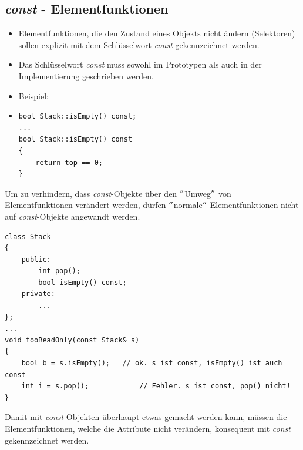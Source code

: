 \subsection{\emph{const} - Elementfunktionen}
\begin{itemize}
	\item Elementfunktionen, die den Zustand eines Objekts nicht ändern (Selektoren) sollen explizit mit dem Schlüsselwort \emph{const} gekennzeichnet werden.
	\item Das Schlüsselwort \emph{const} muss sowohl im Prototypen als auch in der Implementierung geschrieben werden.
	\item Beispiel:
	\item[\-] \vspace{-\baselineskip}
	\begin{minipage}{0.4\linewidth}
\begin{lstlisting}
bool Stack::isEmpty() const;
...
bool Stack::isEmpty() const
{
	return top == 0;
}
\end{lstlisting}
	\end{minipage}
\end{itemize}
Um zu verhindern, dass \emph{const}-Objekte über den $"$Umweg$"$ von Elementfunktionen verändert werden, dürfen $"$normale$"$ Elementfunktionen nicht auf \emph{const}-Objekte angewandt werden.
\noindent
\begin{minipage}{0.9\linewidth}
\begin{lstlisting}
class Stack
{
	public:
		int pop();
		bool isEmpty() const;
	private:
		...
};
...
void fooReadOnly(const Stack& s)
{
	bool b = s.isEmpty();	// ok. s ist const, isEmpty() ist auch const
	int i = s.pop();			// Fehler. s ist const, pop() nicht!
}
\end{lstlisting}
\end{minipage}

\begin{hinweis}
Damit mit \emph{const}-Objekten überhaupt etwas gemacht werden kann, müssen die Elementfunktionen, welche die Attribute nicht verändern, konsequent mit \emph{const} gekennzeichnet werden.
\end{hinweis}

